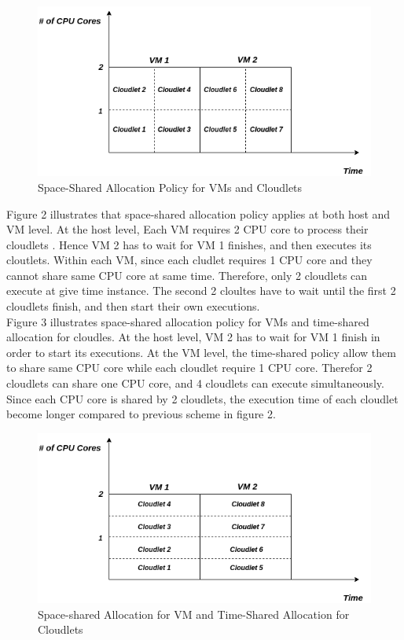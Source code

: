 \documentclass[12pt]{article}
\begin{document}
\begin{figure}[ht!]
\centering
\includegraphics[scale=0.4]{space_vm_space_cloudlet.png}
\caption{Space-Shared Allocation Policy for VMs and Cloudlets}
\end{figure}

\indent  Figure 2 illustrates that space-shared allocation policy applies at both host and VM level.  At the host level,  Each VM requires 2 CPU core to  process their cloudlets . Hence VM 2 has to wait  for VM 1 finishes, and then executes its cloutlets.  Within each VM,  since each cludlet requires 1 CPU core and they cannot share same CPU core at same time. Therefore, only  2  cloudlets can execute at give time instance.  The second 2 cloultes have to wait until the first 2 cloudlets finish, and then start their own executions.\\
\indent Figure 3 illustrates space-shared allocation policy for VMs and time-shared allocation for cloudles. At the host level,  VM 2 has to wait for VM 1 finish in order to start its executions.  At the VM level,  the time-shared policy allow them to share same CPU core while each cloudlet require 1 CPU core. Therefor 2 cloudlets can share one CPU core, and 4 cloudlets can execute simultaneously. Since each CPU core is shared by 2 cloudlets, the execution time of each cloudlet become longer compared to previous scheme in figure 2.
\newpage
\begin{figure}[ht!]
\centering
\includegraphics[scale=0.4]{space_vm_time_cloudlet.png}
\caption{Space-shared Allocation for VM and Time-Shared Allocation for Cloudlets}
\end{figure}
\end{document}
